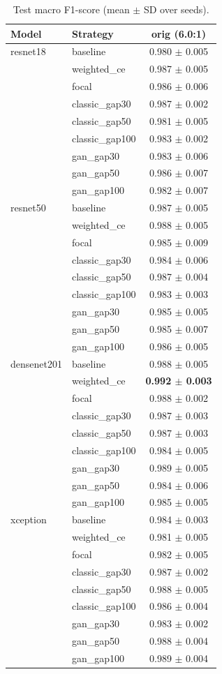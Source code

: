 \begin{table}[htbp]
\centering
\caption{Test macro F1-score (mean $\pm$ SD over seeds).}
\label{tab:macro_f1}
\begin{tabular}{llc}
\toprule
Model & Strategy & orig (6.0:1) \\
\midrule
resnet18 & baseline & 0.980 $\pm$ 0.005 \\
 & weighted\_ce & 0.987 $\pm$ 0.005 \\
 & focal & 0.986 $\pm$ 0.006 \\
 & classic\_gap30 & 0.987 $\pm$ 0.002 \\
 & classic\_gap50 & 0.981 $\pm$ 0.005 \\
 & classic\_gap100 & 0.983 $\pm$ 0.002 \\
 & gan\_gap30 & 0.983 $\pm$ 0.006 \\
 & gan\_gap50 & 0.986 $\pm$ 0.007 \\
 & gan\_gap100 & 0.982 $\pm$ 0.007 \\
\addlinespace
resnet50 & baseline & 0.987 $\pm$ 0.005 \\
 & weighted\_ce & 0.988 $\pm$ 0.005 \\
 & focal & 0.985 $\pm$ 0.009 \\
 & classic\_gap30 & 0.984 $\pm$ 0.006 \\
 & classic\_gap50 & 0.987 $\pm$ 0.004 \\
 & classic\_gap100 & 0.983 $\pm$ 0.003 \\
 & gan\_gap30 & 0.985 $\pm$ 0.005 \\
 & gan\_gap50 & 0.985 $\pm$ 0.007 \\
 & gan\_gap100 & 0.986 $\pm$ 0.005 \\
\addlinespace
densenet201 & baseline & 0.988 $\pm$ 0.005 \\
 & weighted\_ce & \textbf{0.992 $\pm$ 0.003} \\
 & focal & 0.988 $\pm$ 0.002 \\
 & classic\_gap30 & 0.987 $\pm$ 0.003 \\
 & classic\_gap50 & 0.987 $\pm$ 0.003 \\
 & classic\_gap100 & 0.984 $\pm$ 0.005 \\
 & gan\_gap30 & 0.989 $\pm$ 0.005 \\
 & gan\_gap50 & 0.984 $\pm$ 0.006 \\
 & gan\_gap100 & 0.985 $\pm$ 0.005 \\
\addlinespace
xception & baseline & 0.984 $\pm$ 0.003 \\
 & weighted\_ce & 0.981 $\pm$ 0.005 \\
 & focal & 0.982 $\pm$ 0.005 \\
 & classic\_gap30 & 0.987 $\pm$ 0.002 \\
 & classic\_gap50 & 0.988 $\pm$ 0.005 \\
 & classic\_gap100 & 0.986 $\pm$ 0.004 \\
 & gan\_gap30 & 0.983 $\pm$ 0.002 \\
 & gan\_gap50 & 0.988 $\pm$ 0.004 \\
 & gan\_gap100 & 0.989 $\pm$ 0.004 \\
\bottomrule
\end{tabular}
\end{table}